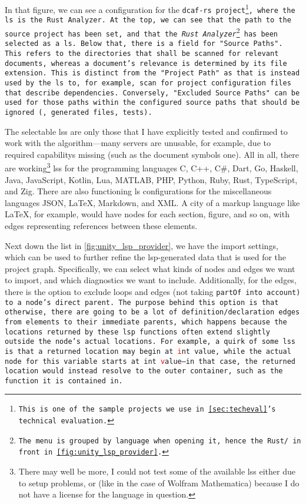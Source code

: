 \documentclass[../thesis]{subfiles}
\begin{document}
In that figure, we can see a configuration for the \tt{dcaf-rs} project\footnote{
	This is one of the sample projects we use in \cref{sec:techeval}'s technical evaluation.
}, where the \gls{ls} is the Rust Analyzer.
At the top, we can see that the path to the source project has been set, and that the \emph{Rust Analyzer}\footnote{
	The menu is grouped by language when opening it, hence the \texttt{Rust/} in front in \cref{fig:unity_lsp_provider}.
} has been selected as a \gls{ls}.
Below that, there is a field for "Source Paths".
This refers to the directories that shall be scanned for relevant documents, whereas a document's relevance is determined by its file extension.
This is distinct from the "Project Path" as that is instead used by the \gls{ls} to, for example, scan for project configuration files that describe dependencies.
Conversely, "Excluded Source Paths" can be used for those paths within the configured source paths that should be ignored (\eg, generated files, tests).

The selectable \glspl{ls} are only those that I have explicitly tested and confirmed to work with the algorithm---many servers are unusable, for example, due to required \glspl{capability} missing (such as the document symbols one).
All in all, there are working\footnote{
	There may well be more, I could not test some of the available \glspl{ls} either due to setup problems, or (like in the case of Wolfram Mathematica) because I do not have a license for the language in question.
} \glspl{ls} for the programming languages
C,
C++,
C\#,
Dart,
Go,
Haskell,
Java,
JavaScript,
Kotlin,
Lua,
MATLAB,
PHP,
Python,
Ruby,
Rust,
TypeScript,
and Zig.
There are also functioning \gls{ls} configurations for the miscellaneous languages
JSON,
\LaTeX{},
Markdown,
and XML.
A \gls{city} of a markup language like \LaTeX{}, for example, would have nodes for each section, figure, and so on, with edges representing references between these elements.

Next down the list in \cref{fig:unity_lsp_provider}, we have the import settings, which can be used to further refine the \gls{lsp}-generated data that is used for the project graph.
Specifically, we can select what kinds of nodes and edges we want to import, and which diagnostics we want to include.
Additionally, for the edges, there is the option to exclude loops and edges (not taking \tt{partOf} into account) to a node's direct parent.
The purpose behind this option is that otherwise, there are going to be a lot of definition/declaration edges from elements to their immediate parents, which happens because the locations returned by these \gls{lsp} functions often extend slightly outside the node's actual locations.
For example, a quirk of some \glspl{ls} is that a returned location may begin at \tt{\textcolor{red}{i}nt value}, while the actual node for this variable starts at \tt{int \textcolor{red}{v}alue}---in that case, the returned location would instead resolve to the outer container, such as the function it is contained in.
\end{document}
